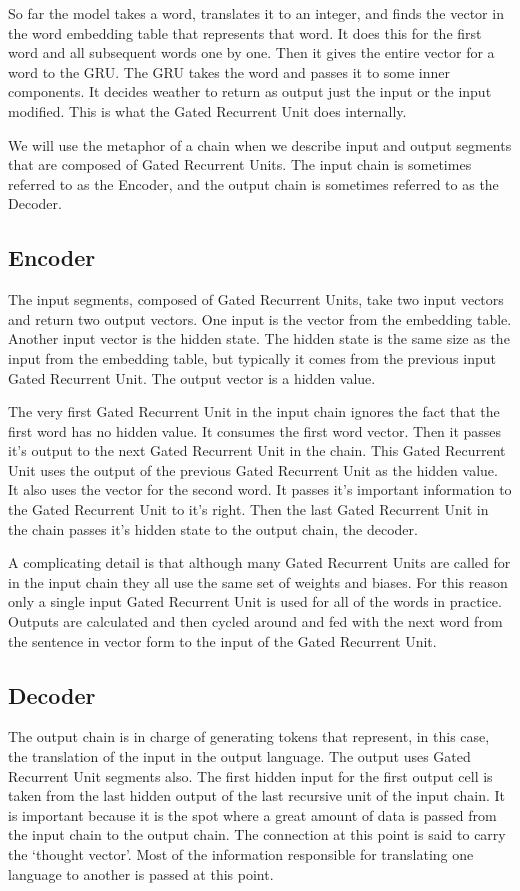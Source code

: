 So far the model takes a word, translates it to an integer, and finds the vector in the word embedding table that represents that word. It does this for the first word and all subsequent words one by one. Then it gives the entire vector for a word to the GRU. The GRU takes the word and passes it to some inner components. It decides weather to return as output just the input or the input modified. This is what the Gated Recurrent Unit does internally.

We will use the metaphor of a chain when we describe input and output segments that are composed of Gated Recurrent Units. The input chain is sometimes referred to as the Encoder, and the output chain is sometimes referred to as the Decoder.

\subsection*{Encoder}

The input segments, composed of Gated Recurrent Units, take two input vectors and return two output vectors. One input is the vector from the embedding table. Another input vector is the hidden state. The hidden state is the same size as the input from the embedding table, but typically it comes from the previous input Gated Recurrent Unit. The output vector is a hidden value.

The very first Gated Recurrent Unit in the input chain ignores the fact that the first word has no hidden value. It consumes the first word vector. Then it passes it's output to the next Gated Recurrent Unit in the chain. This Gated Recurrent Unit uses the output of the previous Gated Recurrent Unit as the hidden value. It also uses the vector for the second word. It passes it's important information to the Gated Recurrent Unit to it's right. Then the last Gated Recurrent Unit in the chain passes it's hidden state to the output chain, the decoder.

A complicating detail is that although many Gated Recurrent Units are called for in the input chain they all use the same set of weights and biases. For this reason only a single input Gated Recurrent Unit is used for all of the words in practice. Outputs are calculated and then cycled around and fed with the next word from the sentence in vector form to the input of the Gated Recurrent Unit. 

\subsection*{Decoder}
The output chain is in charge of generating tokens that represent, in this case, the translation of the input in the output language. The output uses Gated Recurrent Unit segments also. The first hidden input for the first output cell is taken from the last hidden output of the last recursive unit of the input chain. It is important because it is the spot where a great amount of data is passed from the input chain to the output chain. The connection at this point is said to carry the `thought vector'. Most of the information responsible for translating one language to another is passed at this point.

